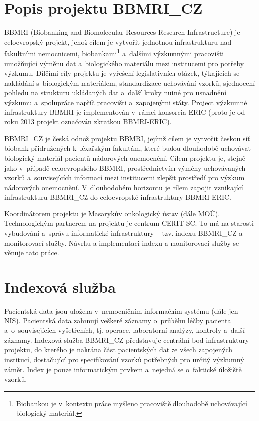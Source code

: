 \documentclass[11pt,draft,oneside]{fithesis2}
\newcommand{\ProjectName}{BBMRI\_CZ\xspace}
\begin{document}
\section{Popis projektu \ProjectName}\label{chapter:analysis:section:projectDescription}
BBMRI (Biobanking and Biomolecular Resources Research Infrastructure) je celoevropský projekt, jehož cílem je vytvořit jednotnou infrastrukturu nad fakultními nemocnicemi, biobankami\footnote{Biobankou je v~kontextu práce myšleno pracoviště dlouhodobě uchovávající biologický materiál.} a~dalšími výzkumnými pracovišti umožňující výměnu dat a~biologického materiálu mezi institucemi pro potřeby výzkumu. Dílčími cíly projektu je vyřešení legislativních otázek, týkajících se nakládání s~biologickým materiálem, standardizace uchovávání vzorků, sjednocení pohledu na strukturu ukládaných dat a~další kroky nutné pro usnadnění výzkumu a~spolupráce napříč pracovišti a~zapojenými státy. Project výzkumné infrastruktury BBMRI je implementován v~rámci konsorcia ERIC (proto je od roku 2013 projekt označován zkratkou BBMRI-ERIC).

\ProjectName je česká odnož projektu BBMRI, jejímž cílem je vytvořit českou síť biobank přidružených k~lékařským fakultám, které budou dlouhodobě uchovávat biologický materiál pacientů nádorových onemocnění. Cílem projektu je, stejně jako v~případě celoevropského BBMRI, prostřednictvím výměny uchovávaných vzorků a~souvisejících informací mezi institucemi zlepšit prostředí pro výzkum nádorových onemocnění. V~dlouhodobém horizontu je cílem zapojit vznikající infrastrukturu \ProjectName do celoevropské infrastruktury BBMRI-ERIC. 

Koordinátorem projektu je Masarykův onkologický ústav (dále MOÚ). Technologickým partnerem na projektu je centrum CERIT-SC. To má na starosti vybudování a~správu informatické infrastruktury – tzv. indexu \ProjectName a monitorovací služby. Návrhu a implementaci indexu a monitorovací služby se věnuje tato práce.

\section{Indexová služba}\label{chapter:analysis:section:index}
Pacientská data jsou uložena v~nemocničním informačním systému (dále jen NIS). Pacientská data zahrnují veškeré záznamy o~průběhu léčby pacienta a~o~souvisejících vyšetřeních, tj. operace, laboratorní analýzy, kontroly a~další záznamy. Indexová služba \ProjectName představuje centrální bod infrastruktury projektu, do kterého je nahrána část pacientských dat ze všech zapojených institucí, dostačující pro specifikování vzorků potřebných pro určitý výzkumný záměr. Index je pouze informatickým prvkem a~nejedná se o~faktické úložiště vzorků.
\end{document}
